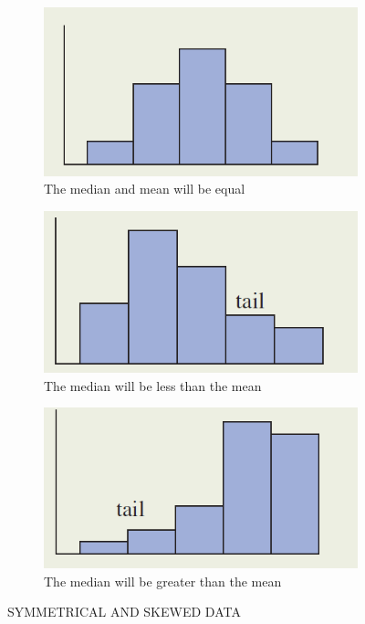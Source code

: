 \documentclass{report}
\begin{document}
\begin{figure}
    \centering
    \begin{subfigure}[b]{0.3\textwidth}
        \centering
        \includegraphics[width=\textwidth]{symmetrical_data.png}
        \caption{The median and mean will be equal}
        \label{Symmetrical Data}
    \end{subfigure}
    \hfill
    \begin{subfigure}[b]{0.3\textwidth}
        \centering
        \includegraphics[width=\textwidth]{positive_data.png}
        \caption{The median will be less than the mean}
        \label{Positively skewed Data}
    \end{subfigure}
    \hfill
    \begin{subfigure}[b]{0.3\textwidth}
        \centering
        \includegraphics[width=\textwidth]{negative_data.png}
        \caption{The median will be greater than the mean}
        \label{Negatively Skewed Data}
    \end{subfigure}
       \caption{SYMMETRICAL AND SKEWED DATA}
       \label{fig: three graphs}
\end{figure}
\end{document}
